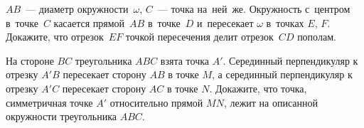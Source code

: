 \begin{problems}
\item
$AB$~--- диаметр окружности~$\omega$, $C$~--- точка на~ней~же.
Окружность с~центром в~точке~$C$ касается прямой~$AB$ в~точке~$D$ и~пересекает
$\omega$ в~точках $E$, $F$.
Докажите, что отрезок~$EF$ точкой пересечения делит отрезок~$CD$ пополам.

\item
На стороне $BC$ треугольника $ABC$ взята точка $A'$.
Серединный перпендикуляр к отрезку $A'B$ пересекает сторону $AB$ в точке $M$,
а серединный перпендикуляр к отрезку $A'C$ пересекает сторону $AC$ в точке $N$.
Докажите, что точка, симметричная точке $A'$ относительно прямой $MN$, лежит на
описанной окружности треугольника $ABC$.

\end{problems}

